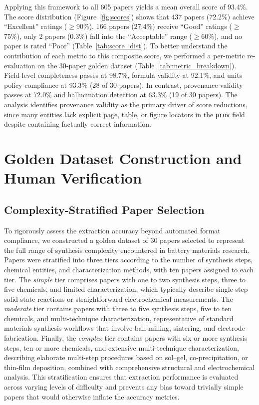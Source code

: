 \documentclass[12pt,a4paper]{article}
\begin{document}
Applying this framework to all 605 papers yields a mean overall score of 93.4\%. The score distribution (Figure~\ref{fig:scores}) shows that 437 papers (72.2\%) achieve ``Excellent'' ratings ($\geq$90\%), 166 papers (27.4\%) receive ``Good'' ratings ($\geq$75\%), only 2 papers (0.3\%) fall into the ``Acceptable'' range ($\geq$60\%), and no paper is rated ``Poor'' (Table~\ref{tab:score_dist}). To better understand the contribution of each metric to this composite score, we performed a per-metric re-evaluation on the 30-paper golden dataset (Table~\ref{tab:metric_breakdown}). Field-level completeness passes at 98.7\%, formula validity at 92.1\%, and units policy compliance at 93.3\% (28 of 30 papers). In contrast, provenance validity passes at 72.0\% and hallucination detection at 63.3\% (19 of 30 papers). The analysis identifies provenance validity as the primary driver of score reductions, since many entities lack explicit page, table, or figure locators in the \texttt{prov} field despite containing factually correct information.

\section{Golden Dataset Construction and Human Verification}
\label{sec:golden}

\subsection{Complexity-Stratified Paper Selection}
\label{sec:selection}

To rigorously assess the extraction accuracy beyond automated format compliance, we constructed a golden dataset of 30 papers selected to represent the full range of synthesis complexity encountered in battery materials research. Papers were stratified into three tiers according to the number of synthesis steps, chemical entities, and characterization methods, with ten papers assigned to each tier. The \textit{simple} tier comprises papers with one to two synthesis steps, three to five chemicals, and limited characterization, which typically describe single-step solid-state reactions or straightforward electrochemical measurements. The \textit{moderate} tier contains papers with three to five synthesis steps, five to ten chemicals, and multi-technique characterization, representative of standard materials synthesis workflows that involve ball milling, sintering, and electrode fabrication. Finally, the \textit{complex} tier contains papers with six or more synthesis steps, ten or more chemicals, and extensive multi-technique characterization, describing elaborate multi-step procedures based on sol--gel, co-precipitation, or thin-film deposition, combined with comprehensive structural and electrochemical analysis. This stratification ensures that extraction performance is evaluated across varying levels of difficulty and prevents any bias toward trivially simple papers that would otherwise inflate the accuracy metrics.
\end{document}

